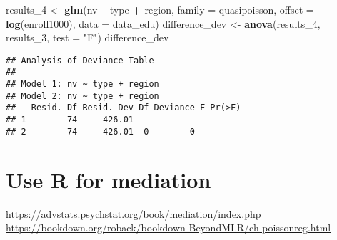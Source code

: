 \documentclass[]{book}
\newenvironment{Shaded}{\begin{snugshade}}{\end{snugshade}}
\newcommand{\DataTypeTok}[1]{\textcolor[rgb]{0.13,0.29,0.53}{#1}}
\newcommand{\DecValTok}[1]{\textcolor[rgb]{0.00,0.00,0.81}{#1}}
\newcommand{\KeywordTok}[1]{\textcolor[rgb]{0.13,0.29,0.53}{\textbf{#1}}}
\newcommand{\NormalTok}[1]{#1}
\newcommand{\OperatorTok}[1]{\textcolor[rgb]{0.81,0.36,0.00}{\textbf{#1}}}
\newcommand{\StringTok}[1]{\textcolor[rgb]{0.31,0.60,0.02}{#1}}
\begin{document}
\begin{Shaded}
\begin{Highlighting}[]
\NormalTok{results_}\DecValTok{4}\NormalTok{ <-}\StringTok{ }\KeywordTok{glm}\NormalTok{(nv }\OperatorTok{~}\StringTok{ }\NormalTok{type }\OperatorTok{+}\StringTok{ }\NormalTok{region, }\DataTypeTok{family =}\NormalTok{ quasipoisson,}
               \DataTypeTok{offset =} \KeywordTok{log}\NormalTok{(enroll1000), }\DataTypeTok{data =}\NormalTok{ data_edu)}
\NormalTok{difference_dev <-}\StringTok{ }\KeywordTok{anova}\NormalTok{(results_}\DecValTok{4}\NormalTok{, results_}\DecValTok{3}\NormalTok{, }\DataTypeTok{test =} \StringTok{"F"}\NormalTok{)}
\NormalTok{difference_dev}
\end{Highlighting}
\end{Shaded}

\begin{verbatim}
## Analysis of Deviance Table
## 
## Model 1: nv ~ type + region
## Model 2: nv ~ type + region
##   Resid. Df Resid. Dev Df Deviance F Pr(>F)
## 1        74     426.01                     
## 2        74     426.01  0        0
\end{verbatim}

\hypertarget{use-r-for-mediation}{%
\chapter{Use R for mediation}\label{use-r-for-mediation}}

\url{https://advstats.psychstat.org/book/mediation/index.php}
\url{https://bookdown.org/roback/bookdown-BeyondMLR/ch-poissonreg.html}


\end{document}
